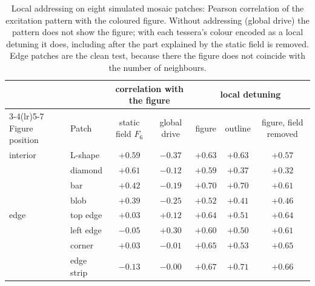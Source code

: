 \documentclass[11pt,a4paper]{article}
\begin{document}
\begin{table}[t]
\footnotesize
\caption{Local addressing on eight simulated mosaic patches: Pearson correlation of the excitation pattern with the coloured figure. Without addressing (global drive) the pattern does not show the figure; with each tessera's colour encoded as a local detuning it does, including after the part explained by the static field is removed. Edge patches are the clean test, because there the figure does not coincide with the number of neighbours.}
\label{tab:addr}

\begin{tabular}{@{}llccccc@{}}
\toprule
 & & \multicolumn{2}{c}{correlation with the figure} & \multicolumn{3}{c}{local detuning} \\
\cmidrule(lr){3-4}\cmidrule(lr){5-7}
Figure position & Patch & static field $F_6$ & global drive & figure & outline & figure, field removed \\
\midrule
interior & L-shape & $+0.59$ & $-0.37$ & $+0.63$ & $+0.63$ & $+0.57$ \\
 & diamond & $+0.61$ & $-0.12$ & $+0.59$ & $+0.37$ & $+0.32$ \\
 & bar & $+0.42$ & $-0.19$ & $+0.70$ & $+0.70$ & $+0.61$ \\
 & blob & $+0.39$ & $-0.25$ & $+0.52$ & $+0.41$ & $+0.46$ \\
\midrule
edge & top edge & $+0.03$ & $+0.12$ & $+0.64$ & $+0.51$ & $+0.64$ \\
 & left edge & $-0.05$ & $+0.30$ & $+0.60$ & $+0.50$ & $+0.61$ \\
 & corner & $+0.03$ & $-0.01$ & $+0.65$ & $+0.53$ & $+0.65$ \\
 & edge strip & $-0.13$ & $-0.00$ & $+0.67$ & $+0.71$ & $+0.66$ \\
\bottomrule
\end{tabular}
\end{table}
\end{document}
